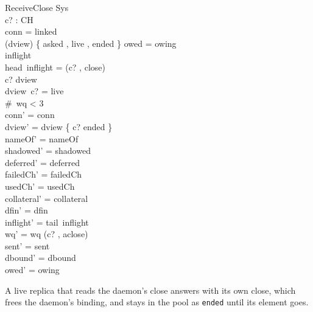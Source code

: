 \documentclass[a4paper,10pt,fleqn]{article}
\begin{document}
\begin{schema}{ReceiveClose}
  \Delta Sys \\
  c? : CH \\
\where
  conn = linked \\
  (\ran dview) \cap \{ asked , live , ended \} \neq \emptyset \lor owed = owing \\
  inflight \neq \langle \rangle \\
  head~inflight = (c? , close) \\
  c? \in \dom dview \\
  dview~c? = live \\
  \#~wq < 3 \\
  conn' = conn \\
  dview' = dview \oplus \{ c? \mapsto ended \} \\
  nameOf' = nameOf \\
  shadowed' = shadowed \\
  deferred' = deferred \\
  failedCh' = failedCh \\
  usedCh' = usedCh \\
  collateral' = collateral \\
  dfin' = dfin \\
  inflight' = tail~inflight \\
  wq' = wq \cat \langle (c? , aclose) \rangle \\
  sent' = sent \\
  dbound' = dbound \\
  owed' = owing
\end{schema}

A live replica that reads the daemon's close answers with its own close, which frees the daemon's binding, and stays in the pool as \texttt{ended} until its element goes.
\end{document}
